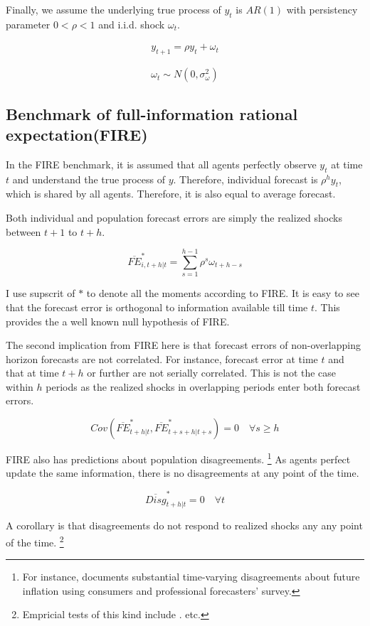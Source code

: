 \documentclass[]{article}
\begin{document}
Finally, we assume the underlying true process of $y_{t}$ is $AR(1)$ with persistency parameter $0<\rho <1$ and i.i.d. shock $\omega_t$. 

\begin{eqnarray}\label{AR_process}
	y_{t+1} = \rho y_t + \omega_t
\end{eqnarray}

$$\omega_t \sim N(0,\sigma^2_{\omega})$$

\subsection{Benchmark of full-information rational expectation(FIRE)}

 In the FIRE benchmark,  it is assumed that all agents perfectly observe $y_t$ at time $t$ and understand the true process of $y$. Therefore, individual forecast is $\rho^h y_t $, which is shared by all agents. Therefore, it is also equal to average forecast. 

Both individual and population forecast errors are simply the realized shocks between $t+1$ to $t+h$.  

$$\overline{FE}^{*}_{i,t+h|t} = \sum^{h-1}_{s=1} \rho^s \omega_{t+h-s}$$ 


I use supscrit of $*$ to denote all the moments according to FIRE. It is easy to see that the forecast error is orthogonal to information available till time $t$. This provides the a well known null hypothesis of FIRE. \citet{xx}

The second implication from FIRE here is that forecast errors of non-overlapping horizon forecasts are not correlated. For instance, forecast error at time $t$ and that at time $t+h$ or further are not serially correlated. This is not the case within $h$ periods as the realized shocks in overlapping periods enter both forecast errors. 

$$Cov(\overline{FE}^{*}_{t+h|t}, \overline{FE}^{*}_{t+s+h|t+s}) = 0 \quad \forall s \geq h$$

FIRE also has predictions about  population disagreements. \footnote{For instance, \citet{mankiw2003disagreement} documents substantial time-varying disagreements about future inflation using consumers and professional forecasters' survey. } As agents perfect update the same information, there is no disagreements at any point of the time. 

$$\overline{Disg}^{*}_{t+h|t}=0 \quad \forall t$$

A corollary is that disagreements do not respond to realized shocks any any point of the time.  \footnote{Empricial tests of this kind include \citet{xx}.\citet{xx} etc. }
\end{document}
